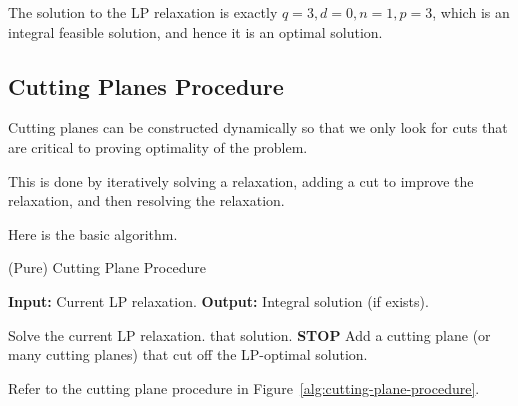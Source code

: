 \begin{example}{}{}
The solution to the LP relaxation is exactly $q = 3, d = 0, n = 1, p = 3$, which is an integral feasible solution, and hence it is an optimal solution.
\end{example}

\subsection{Cutting Planes Procedure}
Cutting planes can be constructed dynamically so that we only look for cuts that are critical to proving optimality of the problem.

This is done by iteratively solving a relaxation, adding a cut to improve the relaxation, and then resolving the relaxation.   

Here is the basic algorithm.
\begin{algorithm}
\caption{(Pure) Cutting Plane Procedure}
\label{alg:cutting-plane-procedure}
\begin{algorithmic}[1]
    \State \textbf{Input:} Current LP relaxation.
    \State \textbf{Output:} Integral solution (if exists).
    
            \State Solve the current LP relaxation.
                \State \Return that solution.
                \State \textbf{STOP}
            \EndIf
            \State Add a cutting plane (or many cutting planes) that cut off the LP-optimal solution.
        \EndWhile
    \EndProcedure
\end{algorithmic}
\end{algorithm}

Refer to the cutting plane procedure in Figure~\ref{alg:cutting-plane-procedure}.

